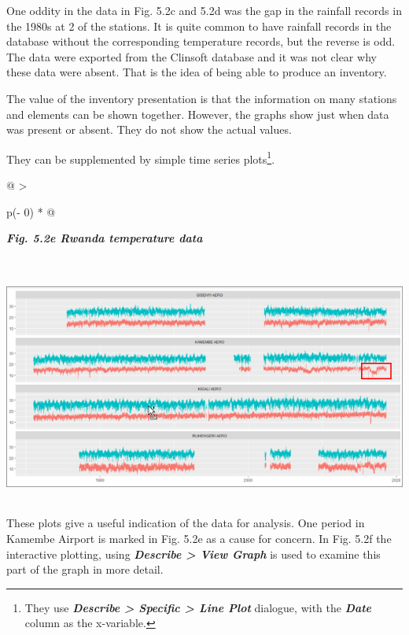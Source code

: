 \documentclass[
  letterpaper,
  DIV=11,
  numbers=noendperiod]{scrreprt}
\begin{document}
One oddity in the data in Fig. 5.2c and 5.2d was the gap in the rainfall
records in the 1980s at 2 of the stations. It is quite common to have
rainfall records in the database without the corresponding temperature
records, but the reverse is odd. The data were exported from the
Clinsoft database and it was not clear why these data were absent. That
is the idea of being able to produce an inventory.

The value of the inventory presentation is that the information on many
stations and elements can be shown together. However, the graphs show
just when data was present or absent. They do not show the actual
values.

They can be supplemented by simple time series plots\footnote{They use
  \textbf{\emph{Describe \textgreater{} Specific \textgreater{} Line
  Plot}} dialogue, with the \textbf{\emph{Date}} column as the
  x-variable.}.

\begin{longtable}[]{@{}
  >{\raggedright\arraybackslash}p{(\columnwidth - 0\tabcolsep) * }@{}}
\toprule\noalign{}
\begin{minipage}[b]{\linewidth}\raggedright
\textbf{\emph{Fig. 5.2e Rwanda temperature data}}
\end{minipage} \\
\midrule\noalign{}
\endhead
\bottomrule\noalign{}
\endlastfoot
\includegraphics[width=6.06614in,height=3.02501in]{figures/Fig5.2e.png} \\
\end{longtable}

These plots give a useful indication of the data for analysis. One
period in Kamembe Airport is marked in Fig. 5.2e as a cause for concern.
In Fig. 5.2f the interactive plotting, using \textbf{\emph{Describe
\textgreater{} View Graph}} is used to examine this part of the graph in
more detail.
\end{document}

